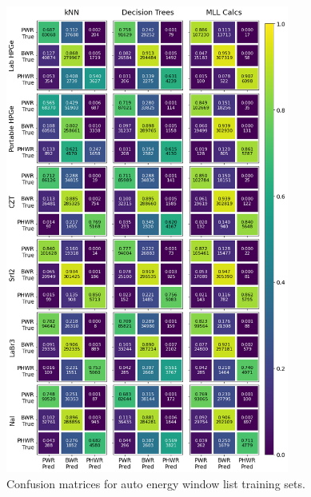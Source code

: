 \begin{figure}[!htb]
  \centering
  \includegraphics[width=0.83\textwidth]{./chapters/exp2/confusion_matrix_6dets_auto.png}
  \caption{Confusion matrices for auto energy window list training sets.}
  \label{fig:cm_auto}
\end{figure}

